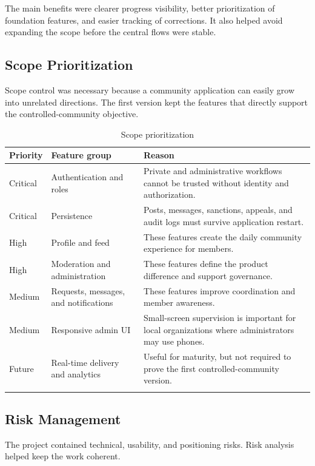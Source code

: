 The main benefits were clearer progress visibility, better prioritization of foundation features, and easier tracking of corrections. It also helped avoid expanding the scope before the central flows were stable.

\subsection*{Scope Prioritization}

Scope control was necessary because a community application can easily grow into unrelated directions. The first version kept the features that directly support the controlled-community objective.

\begin{longtable}{|m{3cm}|m{3.6cm}|m{7cm}|}
\hline
\textbf{Priority} & \textbf{Feature group} & \textbf{Reason} \\
\hline
Critical & Authentication and roles & Private and administrative workflows cannot be trusted without identity and authorization. \\
\hline
Critical & Persistence & Posts, messages, sanctions, appeals, and audit logs must survive application restart. \\
\hline
High & Profile and feed & These features create the daily community experience for members. \\
\hline
High & Moderation and administration & These features define the product difference and support governance. \\
\hline
Medium & Requests, messages, and notifications & These features improve coordination and member awareness. \\
\hline
Medium & Responsive admin UI & Small-screen supervision is important for local organizations where administrators may use phones. \\
\hline
Future & Real-time delivery and analytics & Useful for maturity, but not required to prove the first controlled-community version. \\
\hline
\caption{Scope prioritization}
\end{longtable}

\subsection*{Risk Management}

The project contained technical, usability, and positioning risks. Risk analysis helped keep the work coherent.

